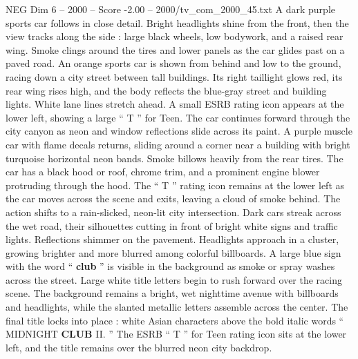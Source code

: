 \begin{textsample}{NEG Dim 6 – 2000 – Score -2.00 – 2000/tv\_com\_2000\_45.txt}
A dark purple sports car follows in close detail.
Bright headlights shine from the front, then the view tracks along the side : large black wheels, low bodywork, and a raised rear wing.
Smoke clings around the tires and lower panels as the car glides past on a paved road.
An orange sports car is shown from behind and low to the ground, racing down a city street between tall buildings.
Its right taillight glows red, its rear wing rises high, and the body reflects the blue-gray street and building lights.
White lane lines stretch ahead.
A small ESRB rating icon appears at the lower left, showing a large “ T ” for Teen.
The car continues forward through the city canyon as neon and window reflections slide across its paint.
A purple muscle car with flame decals returns, sliding around a corner near a building with bright turquoise horizontal neon bands.
Smoke billows heavily from the rear tires.
The car has a black hood or roof, chrome trim, and a prominent engine blower protruding through the hood.
The “ T ” rating icon remains at the lower left as the car moves across the scene and exits, leaving a cloud of smoke behind.
The action shifts to a rain-slicked, neon-lit city intersection.
Dark cars streak across the wet road, their silhouettes cutting in front of bright white signs and traffic lights.
Reflections shimmer on the pavement.
Headlights approach in a cluster, growing brighter and more blurred among colorful billboards.
A large blue sign with the word “ \textbf{club} ” is visible in the background as smoke or spray washes across the street.
Large white title letters begin to rush forward over the racing scene.
The background remains a bright, wet nighttime avenue with billboards and headlights, while the slanted metallic letters assemble across the center.
The final title locks into place : white Asian characters above the bold italic words “ MIDNIGHT \textbf{CLUB} II. ” The ESRB “ T ” for Teen rating icon sits at the lower left, and the title remains over the blurred neon city backdrop.

\end{textsample}
